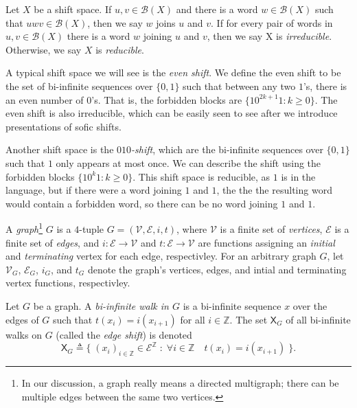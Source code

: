 \documentclass[hidelinks]{report}
\newcommand{\Vc}{\mathcal{V}}
\newcommand{\Ec}{\mathcal{E}}
\newcommand{\Bc}{\mathcal{B}}
\newcommand{\shift}[1]{\mathsf{X}_{#1}}
\newcommand{\term}[1]{\textit{#1}}
\theoremstyle{definition}
\begin{document}
\begin{definition}
    Let \(X\) be a shift space. If \(u, v \in \Bc(X)\) and there 
    is a word \(w \in \Bc(X)\) such that \(uwv \in \Bc(X)\), then we say 
    \(w\) joins \(u\) and \(v\). If for every pair of words in \(u, v \in \Bc(X)\) 
    there is a word \(w\) joining \(u\) and \(v\), then we say X is \term{irreducible}.
    Otherwise, we say \(X\) is \term{reducible}.
\end{definition}

\begin{example}
    A typical shift space we will see is the \term{even shift}. We define 
    the even shift to be the set of bi-infinite sequences over \(\{0, 1\}\)
    such that between any two \(1\)'s, there is an even number of \(0\)'s. That 
    is, the forbidden blocks are \(\{10^{2k+1}1 : k \geq 0\}\). The even shift is 
    also irreducible, which can be easily seen to see after we introduce 
    presentations of sofic shifts. 

    Another shift space is the \term{\(010\)-shift}, which are 
    the bi-infinite sequences over \(\{0, 1\}\) such that \(1\) only appears at most once. 
    We can describe the shift using the forbidden blocks \(\{10^k1 : k \geq 0\}\). This 
    shift space is reducible, as \(1\) is in the language, but if there 
    were a word joining \(1\) and \(1\), the the the resulting 
    word would contain a forbidden word, so there can be no word joining \(1\) and \(1\).
\end{example}

\begin{definition}
    A \term{graph}\footnote{
        In our discussion, a graph really means a directed multigraph; there 
        can be multiple edges between the same two vertices.
    } \(G\) is a \(4\)-tuple \(G = (\Vc, \Ec, i, t)\), where \(\Vc\) is a finite 
    set of \term{vertices}, \(\Ec\) is a finite set of \term{edges}, and \(i : \Ec \to \Vc\) and 
    \(t : \Ec \to \Vc\) are functions assigning an \term{initial} and \term{terminating} vertex for 
    each edge, respectivley. For an arbitrary graph \(G\), let 
    \(\Vc_G\), \(\Ec_G\), \(i_G\), and \(t_G\) denote the graph's vertices, edges, and 
    intial and terminating vertex functions, respectivley. 
\end{definition}


\begin{definition}
    Let \(G\) be a graph. A \term{bi-infinite walk in \(G\)} is 
    a bi-infinite sequence \(x\) over the edges of \(G\) such that \(t(x_i) = i(x_{i+1})\)
    for all \(i \in \mathbb{Z}\).
    The set \(\shift{G}\) of all bi-infinite 
    walks on \(G\) (called the \term{edge shift}) is denoted
    \[\shift{G} \triangleq \big\{ \; (x_i)_{i \in \mathbb{Z}} \in \Ec^\mathbb{Z} \; : \; \forall i \in \mathbb{Z} \quad t(x_i) = i(x_{i+1}) \; \big\}. \]
\end{definition}
\end{document}
